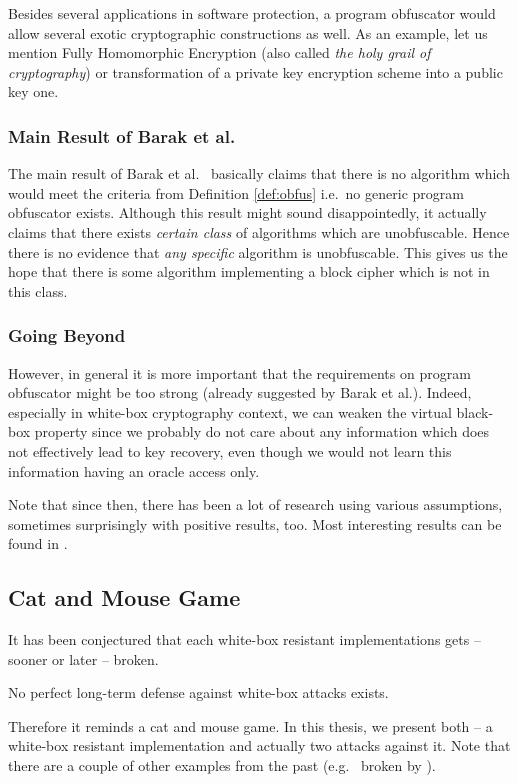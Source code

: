 	Besides several applications in software protection, a program obfuscator would allow several exotic cryptographic constructions as well. As an example, let us mention Fully Homomorphic Encryption (also called {\em the holy grail of cryptography}) or transformation of a private key encryption scheme into a public key one.

\subsubsection{Main Result of Barak et al.}
	
	The main result of Barak et al.\ \cite{barak2001possibility} basically claims that there is no algorithm which would meet the criteria from Definition \ref{def:obfus} i.e.\ no generic program obfuscator exists. Although this result might sound disappointedly, it actually claims that there exists {\em certain class} of algorithms which are unobfuscable. Hence there is no evidence that {\em any specific} algorithm is unobfuscable. This gives us the hope that there is some algorithm implementing a block cipher which is not in this class.

\subsubsection{Going Beyond}
	
	However, in general it is more important that the requirements on program obfuscator might be too strong (already suggested by Barak et al.). Indeed, especially in white-box cryptography context, we can weaken the virtual black-box property since we probably do not care about any information which does not effectively lead to key recovery, even though we would not learn this information having an oracle access only.
	
	Note that since then, there has been a lot of research using various assumptions, sometimes surprisingly with positive results, too. Most interesting results can be found in \cite{barak2014protecting, brakerski2014virtual}.



\subsection{Cat and Mouse Game}
\label{sec:catmouse}

It has been conjectured that each white-box resistant implementations gets -- sooner or later -- broken.
\begin{conj}
	No perfect long-term defense against white-box attacks exists.
\end{conj}
Therefore it reminds a cat and mouse game. In this thesis, we present both -- a white-box resistant implementation and actually two attacks against it. Note that there are a couple of other examples from the past (e.g.\ \cite{chow2002des} broken by \cite{jacob2002attacking}).
